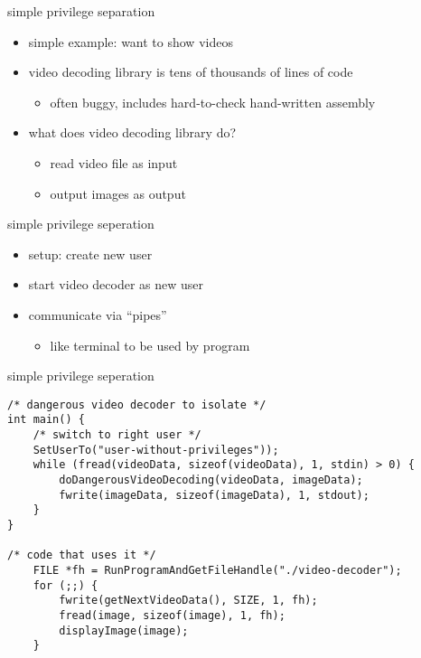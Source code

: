 
\begin{frame}{simple privilege separation}
    \begin{itemize}
    \item simple example: want to show videos
    \item video decoding library is tens of thousands of lines of code
        \begin{itemize}
        \item often buggy, includes hard-to-check hand-written assembly
        \end{itemize}
    \item what does video decoding library do?
        \begin{itemize}
        \item read video file as input
        \item output images as output
        \end{itemize}
    \end{itemize}
\end{frame}

\begin{frame}{simple privilege seperation}
    \begin{itemize}
    \item setup: create new user
    \item start video decoder as new user
    \item communicate via ``pipes''
        \begin{itemize}
        \item like terminal to be used by program
        \end{itemize}
    \end{itemize}
\end{frame}

\begin{frame}[fragile,label=privSepOutline]{simple privilege seperation}
\begin{verbatim}
/* dangerous video decoder to isolate */
int main() {
    /* switch to right user */
    SetUserTo("user-without-privileges"));
    while (fread(videoData, sizeof(videoData), 1, stdin) > 0) {
        doDangerousVideoDecoding(videoData, imageData);
        fwrite(imageData, sizeof(imageData), 1, stdout);
    }
}

/* code that uses it */
    FILE *fh = RunProgramAndGetFileHandle("./video-decoder");
    for (;;) {
        fwrite(getNextVideoData(), SIZE, 1, fh);
        fread(image, sizeof(image), 1, fh);
        displayImage(image);
    }
\end{verbatim}
\end{frame}


